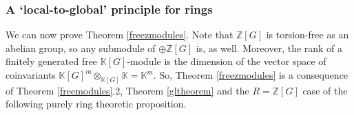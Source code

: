 \documentclass[11pt,letterpaper]{amsart}
\newtheorem{lemma}[theorem]{Lemma}
\begin{document}






\subsubsection*{A `local-to-global' principle for rings} We can now prove Theorem \ref{freezmodules}. Note that $\mathbb Z[G]$ is torsion-free as an abelian group, so any submodule of $\oplus\mathbb Z[G]$ is, as well. Moreover, the rank of a finitely generated free $\mathbb K[G]$-module is the dimension of the vector space of coinvariants $\mathbb K[G]^m\otimes_{\mathbb K[G]}\mathbb K=\mathbb K^m$. So, Theorem \ref{freezmodules} is a consequence of Theorem \ref{freemodules}.2, Theorem \ref{gltheorem} and the $R=\mathbb Z[G]$ case of the following purely ring theoretic proposition.  
\end{document}
